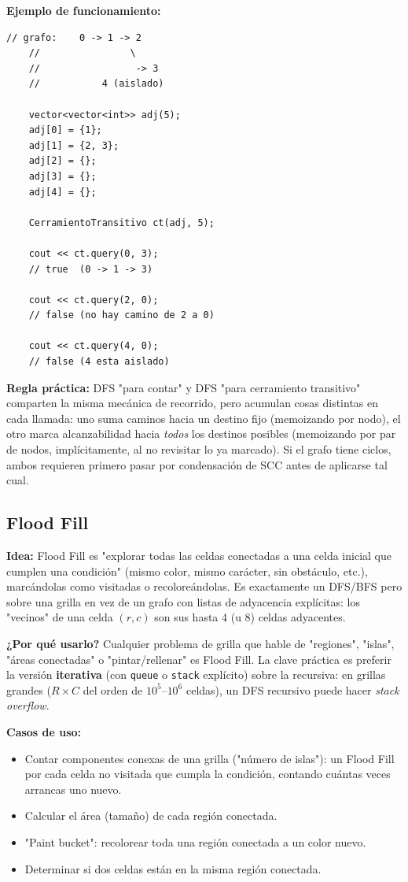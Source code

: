 \documentclass[10pt,a4paper,twocolumn]{article}
\begin{document}
\textbf{Ejemplo de funcionamiento:}

\begin{lstlisting}[style=cpp]
	// grafo:    0 -> 1 -> 2
	//                \
	//                 -> 3
	//           4 (aislado)
	
	vector<vector<int>> adj(5);
	adj[0] = {1};
	adj[1] = {2, 3};
	adj[2] = {};
	adj[3] = {};
	adj[4] = {};
	
	CerramientoTransitivo ct(adj, 5);
	
	cout << ct.query(0, 3);
	// true  (0 -> 1 -> 3)
	
	cout << ct.query(2, 0);
	// false (no hay camino de 2 a 0)
	
	cout << ct.query(4, 0);
	// false (4 esta aislado)
\end{lstlisting}

\textbf{Regla práctica:} DFS "para contar" y DFS "para cerramiento
transitivo" comparten la misma mecánica de recorrido, pero acumulan
cosas distintas en cada llamada: uno suma caminos hacia un destino
fijo (memoizando por nodo), el otro marca alcanzabilidad hacia
\emph{todos} los destinos posibles (memoizando por par de nodos,
implícitamente, al no revisitar lo ya marcado). Si el grafo tiene
ciclos, ambos requieren primero pasar por condensación de SCC antes
de aplicarse tal cual.

\subsection{Flood Fill}

\textbf{Idea:} Flood Fill es "explorar todas las celdas conectadas a
una celda inicial que cumplen una condición" (mismo color, mismo
carácter, sin obstáculo, etc.), marcándolas como visitadas o
recoloreándolas. Es exactamente un DFS/BFS pero sobre una grilla en
vez de un grafo con listas de adyacencia explícitas: los "vecinos"
de una celda $(r,c)$ son sus hasta 4 (u 8) celdas adyacentes.

\textbf{¿Por qué usarlo?} Cualquier problema de grilla que hable de
"regiones", "islas", "áreas conectadas" o "pintar/rellenar" es Flood
Fill. La clave práctica es preferir la versión \textbf{iterativa}
(con \texttt{queue} o \texttt{stack} explícito) sobre la recursiva:
en grillas grandes ($R \times C$ del orden de $10^5$–$10^6$ celdas),
un DFS recursivo puede hacer \textit{stack overflow}.

\textbf{Casos de uso:}

\begin{itemize}
	\item Contar componentes conexas de una grilla ("número de
	islas"): un Flood Fill por cada celda no visitada que cumpla la
	condición, contando cuántas veces arrancas uno nuevo.
	\item Calcular el área (tamaño) de cada región conectada.
	\item "Paint bucket": recolorear toda una región conectada a un
	color nuevo.
	\item Determinar si dos celdas están en la misma región conectada.
\end{itemize}
\end{document}
